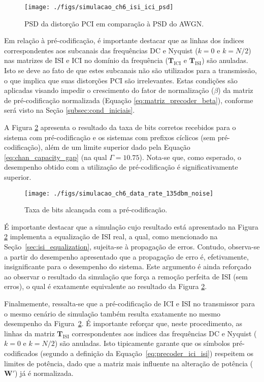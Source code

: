 \begin{figure}[htbp]
\centering
\texttt{[image: ./figs/simulacao\_ch6\_isi\_ici\_psd]}
\caption{PSD da distorção PCI em comparação à PSD do AWGN.
\label{fig:ch6_isi_ici_psd}}
\end{figure}

Em relação à pré-codificação, é importante destacar que as linhas dos índices correspondentes aos subcanais das frequências DC e Nyquist ($k=0$ e $k=N/2$) nas matrizes de ISI e ICI no domínio da frequência ($\mathbf{T}_\text{ICI}$ e $\mathbf{T}_\text{ISI}$) são anuladas. Isto se deve ao fato de que estes subcanais não são utilizados para a transmissão, o que implica que suas distorções PCI são irrelevantes. Estas condições são aplicadas visando impedir o crescimento do fator de normalização ($\beta$) da matriz de pré-codificação normalizada (Equação \ref{eq:matriz_precoder_beta}), conforme será visto na Seção \ref{subsec:cond_iniciais}.

A Figura \ref{fig:simulacao_ch6_data_rate_135dbm_noise} apresenta o resultado da taxa de bits corretos recebidos para o sistema com pré-codificação e os sistemas com prefixos cíclicos (sem pré-codificação), além de um limite superior dado pela Equação \ref{eq:chan_capacity_gap} (na qual $\Gamma=10.75$). Nota-se que, como esperado, o desempenho obtido com a utilização de pré-codificação é significativamente superior.

\begin{figure}[htbp]
\centering
\texttt{[image: ./figs/simulacao\_ch6\_data\_rate\_135dbm\_noise]}
\caption{Taxa de bits alcançada com a pré-codificação.
\label{fig:simulacao_ch6_data_rate_135dbm_noise}}
\end{figure}

É importante destacar que a simulação cujo resultado está apresentado na Figura \ref{fig:simulacao_ch6_data_rate_135dbm_noise} implementa a equalização de ISI real, a qual, como mencionado na Seção~\ref{sec:isi_equalization}, sujeita-se à propagação de erros. Contudo, observa-se a partir do desempenho apresentado que a propagação de erro é, efetivamente, insignificante para o desempenho do sistema. Este argumento é ainda reforçado ao observar o resultado da simulação que força a remoção perfeita de ISI (sem erros), o qual é exatamente equivalente ao resultado da Figura \ref{fig:simulacao_ch6_data_rate_135dbm_noise}.

Finalmemente, ressalta-se que a pré-codificação de ICI e ISI no transmissor para o mesmo cenário de simulação também resulta exatamente no mesmo desempenho da Figura~\ref{fig:simulacao_ch6_data_rate_135dbm_noise}. É importante reforçar que, neste procedimento, as linhas da matriz $\mathbf{T}_\text{ISI}$ correspondentes aos indices das frequências DC e Nyquist ($k=0$ e $k=N/2$) são anuladas. Isto tipicamente garante que os símbolos pré-codificados (segundo a definição da Equação~\ref{eq:precoder_ici_isi}) respeitem os limites de potência, dado que a matriz mais influente na alteração de potência ($\mathbf{W'}$) já é normalizada.

